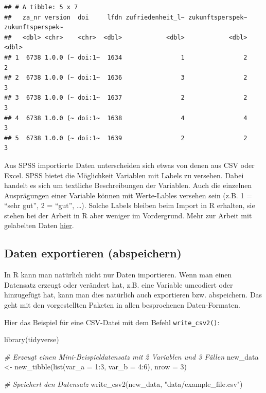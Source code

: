 \documentclass[
]{book}
\newenvironment{Shaded}{\begin{snugshade}}{\end{snugshade}}
\newcommand{\AttributeTok}[1]{\textcolor[rgb]{0.77,0.63,0.00}{#1}}
\newcommand{\CommentTok}[1]{\textcolor[rgb]{0.56,0.35,0.01}{\textit{#1}}}
\newcommand{\DecValTok}[1]{\textcolor[rgb]{0.00,0.00,0.81}{#1}}
\newcommand{\FunctionTok}[1]{\textcolor[rgb]{0.00,0.00,0.00}{#1}}
\newcommand{\NormalTok}[1]{#1}
\newcommand{\OtherTok}[1]{\textcolor[rgb]{0.56,0.35,0.01}{#1}}
\newcommand{\SpecialCharTok}[1]{\textcolor[rgb]{0.00,0.00,0.00}{#1}}
\newcommand{\StringTok}[1]{\textcolor[rgb]{0.31,0.60,0.02}{#1}}
\begin{document}
\begin{verbatim}
## # A tibble: 5 x 7
##   za_nr version  doi     lfdn zufriedenheit_l~ zukunftsperspek~ zukunftsperspek~
##   <dbl> <chr>    <chr>  <dbl>            <dbl>            <dbl>            <dbl>
## 1  6738 1.0.0 (~ doi:1~  1634                1                2                2
## 2  6738 1.0.0 (~ doi:1~  1636                3                2                3
## 3  6738 1.0.0 (~ doi:1~  1637                2                2                3
## 4  6738 1.0.0 (~ doi:1~  1638                4                4                3
## 5  6738 1.0.0 (~ doi:1~  1639                2                2                3
\end{verbatim}

Aus SPSS importierte Daten unterscheiden sich etwas von denen aus CSV oder Excel. SPSS bietet die Möglichkeit Variablen mit Labels zu versehen. Dabei handelt es sich um textliche Beschreibungen der Variablen. Auch die einzelnen Ausprägungen einer Variable können mit Werte-Lables versehen sein (z.B. 1 = ``sehr gut'', 2 = ``gut'', \ldots). Solche Labels bleiben beim Import in R erhalten, sie stehen bei der Arbeit in R aber weniger im Vordergrund. Mehr zur Arbeit mit gelabelten Daten \protect\hyperlink{work_labelled}{hier}.

\hypertarget{daten-exportieren-abspeichern}{%
\subsection{Daten exportieren (abspeichern)}\label{daten-exportieren-abspeichern}}

In R kann man natürlich nicht nur Daten importieren. Wenn man einen Datensatz erzeugt oder verändert hat, z.B. eine Variable umcodiert oder hinzugefügt hat, kann man dies natürlich auch exportieren bzw. abspeichern. Das geht mit den vorgestellten Paketen in allen besprochenen Daten-Formaten.

Hier das Beispiel für eine CSV-Datei mit dem Befehl \texttt{write\_csv2()}:

\begin{Shaded}
\begin{Highlighting}[]
\FunctionTok{library}\NormalTok{(tidyverse)}

\CommentTok{\# Erzeugt einen Mini{-}Beispieldatensatz mit 2 Variablen und 3 Fällen}
\NormalTok{new\_data }\OtherTok{\textless{}{-}} \FunctionTok{new\_tibble}\NormalTok{(}\FunctionTok{list}\NormalTok{(}\AttributeTok{var\_a =} \DecValTok{1}\SpecialCharTok{:}\DecValTok{3}\NormalTok{, }\AttributeTok{var\_b =} \DecValTok{4}\SpecialCharTok{:}\DecValTok{6}\NormalTok{), }\AttributeTok{nrow =} \DecValTok{3}\NormalTok{)}

\CommentTok{\# Speichert den Datensatz}
\FunctionTok{write\_csv2}\NormalTok{(new\_data, }\StringTok{"data/example\_file.csv"}\NormalTok{)}
\end{Highlighting}
\end{Shaded}
\end{document}
